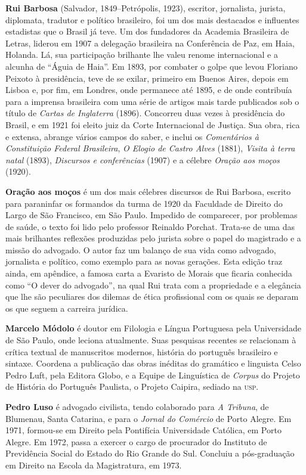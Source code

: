 \textbf{Rui Barbosa} (Salvador, 1849--Petrópolis, 1923), escritor, jornalista, 
jurista, diplomata, tradutor e político brasileiro, foi um dos mais destacados 
e influentes estadistas que o Brasil já teve. Um dos fundadores da Academia 
Brasileira de Letras, liderou em 1907 a delegação brasileira na Conferência 
de Paz, em Haia, Holanda. Lá, sua participação brilhante lhe valeu renome 
internacional e a alcunha de “Águia de Haia”. Em 1893, por combater o golpe 
que levou Floriano Peixoto à presidência, teve de se exilar, primeiro em  
Buenos Aires, depois em Lisboa e, por fim, em Londres, onde permanece até 
1895, e de onde contribuía para a imprensa brasileira com uma série de 
artigos mais tarde publicados sob o título de \textit{Cartas de Inglaterra} 
(1896). Concorreu duas vezes à presidência do Brasil, e em 1921 foi eleito 
juiz da Corte Internacional de Justiça. Sua obra, rica e extensa, abrange 
vários campos do saber, e inclui os \textit{Comentários à Constituição 
Federal Brasileira}, \textit{O Elogio de Castro Alves} (1881), 
\textit{Visita à terra natal} (1893), \textit{Discursos e conferências} 
(1907) e a célebre \textit{Oração aos moços} (1920).

\textbf{Oração aos moços} é um dos mais célebres discursos de Rui
Barbosa, escrito para paraninfar os formandos da
turma de 1920 da Faculdade de Direito do Largo de São Francisco, em São
Paulo. Impedido de comparecer,  por problemas de saúde, o texto foi
lido pelo professor Reinaldo Porchat. Trata-se de uma das mais
brilhantes reflexões produzidas pelo jurista sobre o papel do
magistrado e a missão do advogado. O autor faz um balanço de sua vida
como advogado, jornalista e político, como exemplo para as novas
gerações. Esta edição traz ainda, em apêndice, a famosa carta
a Evaristo de Morais que ficaria conhecida como ``O dever do advogado'',
na qual Rui trata com a propriedade e a elegância que lhe são peculiares
dos dilemas de ética profissional com os quais se deparam os que 
seguem a carreira jurídica. 


\textbf{Marcelo Módolo} é doutor em Filologia e Língua Portuguesa pela
Universidade de São Paulo, onde leciona atualmente. Suas pesquisas
recentes se relacionam à crítica textual de manuscritos modernos,
história do português brasileiro e sintaxe. Coordena a publicação 
das obras inéditas do gramático e linguista Celso Pedro Luft, 
pela Editora Globo, e a Equipe de Linguística de \textit{Corpus} 
do Projeto de História do Português Paulista, o
Projeto Caipira, sediado na \textsc{usp}.

\textbf{Pedro Luso} é advogado civilista, tendo colaborado para \textit{A Tribuna}, 
de  Blumenau, Santa Catarina, e para o \textit{Jornal do Comércio} de Porto Alegre.  
Em 1971, formou-se em  Direito pela Pontifícia Universidade Católica, 
em Porto Alegre.  Em 1972,  passa a exercer o cargo de procurador do 
Instituto de Previdência  Social do Estado do Rio Grande do Sul.  
Concluiu a pós-graduação em Direito na Escola da Magistratura, em 1973. 


